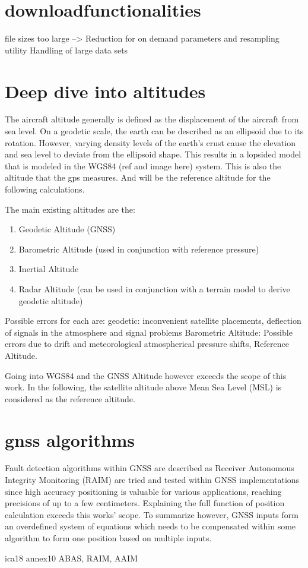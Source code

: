 \section{downloadfunctionalities}
file sizes too large --> Reduction for on demand parameters and resampling utility
Handling of large data sets


\section{Deep dive into altitudes}

The aircraft altitude generally is defined as the displacement of the aircraft from sea level.
On a geodetic scale, the earth can be described as an ellipsoid due to its rotation. However, varying density levels of the earth's crust cause the elevation and sea level to deviate from the ellipsoid shape. This results in a lopsided model that is modeled in the WGS84 (ref and image here) system. This is also the altitude that the gps measures. And will be the reference altitude for the following calculations.

The main existing altitudes are the:
\begin{enumerate}
    \item Geodetic Altitude (GNSS)
    \item Barometric Altitude (used in conjunction with reference pressure)
    \item Inertial Altitude
    \item Radar Altitude (can be used in conjunction with a terrain model to derive geodetic altitude)
\end{enumerate}
Possible errors for each are:
geodetic: inconvenient satellite placements, deflection of signals in the atmosphere and signal problems
Barometric Altitude: Possible errors due to drift and meteorological atmospherical pressure shifts, Reference Altitude.

Going into WGS84 and the GNSS Altitude however exceeds the scope of this work. In the following, the satellite altitude above Mean Sea Level (MSL) is considered as the reference altitude.


\section{gnss algorithms}

Fault detection algorithms within GNSS are described as Receiver Autonomous Integrity Monitoring (RAIM) are tried and tested within GNSS implementations since high accuracy positioning is valuable for various applications, reaching precisions of up to a few centimeters. Explaining the full function of position calculation exceeds this works' scope. To summarize however, GNSS inputs form an overdefined system of equations which needs to be compensated within some algorithm to form one position based on multiple inputs.


ica18 annex10
ABAS, RAIM, AAIM

